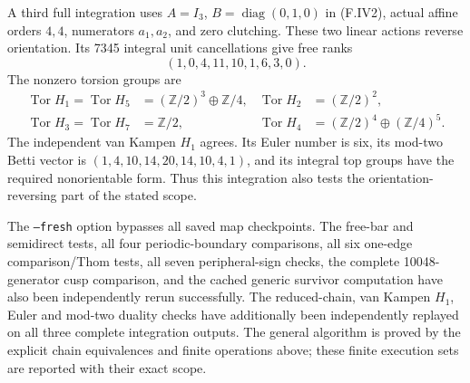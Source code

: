 A third full integration uses
$A=I_3$, $B=\operatorname{diag}(0,1,0)$ in (F.IV2),
actual affine orders $4,4$, numerators $a_1,a_2$, and zero
clutching.  These two linear actions reverse orientation.
Its 7345 integral unit cancellations give free ranks
\[
                  (1,0,4,11,10,1,6,3,0).
\]
The nonzero torsion groups are
\[
\begin{aligned}
 \operatorname{Tor}H_1=\operatorname{Tor}H_5
       &=(\mathbb Z/2)^3\oplus\mathbb Z/4,&
 \operatorname{Tor}H_2&=(\mathbb Z/2)^2,\\
 \operatorname{Tor}H_3=\operatorname{Tor}H_7
       &=\mathbb Z/2,&
 \operatorname{Tor}H_4&=(\mathbb Z/2)^4\oplus(\mathbb Z/4)^5.
\end{aligned}
\]
The independent van Kampen $H_1$ agrees.  Its Euler number
is six, its mod-two Betti vector is
$(1,4,10,14,20,14,10,4,1)$, and its integral top groups
have the required nonorientable form.  Thus this integration
also tests the orientation-reversing part of the stated scope.

The \texttt{--fresh} option bypasses all saved map checkpoints.
The free-bar and semidirect tests, all four periodic-boundary
comparisons, all six one-edge comparison/Thom tests, all seven
peripheral-sign checks, the complete 10048-generator cusp
comparison, and the cached generic survivor computation have
also been independently rerun successfully.  The
reduced-chain, van Kampen $H_1$, Euler and mod-two duality
checks have additionally been independently replayed on
all three complete integration outputs.  The general
algorithm is proved by the explicit chain equivalences and
finite operations above; these finite execution sets are
reported with their exact scope.

